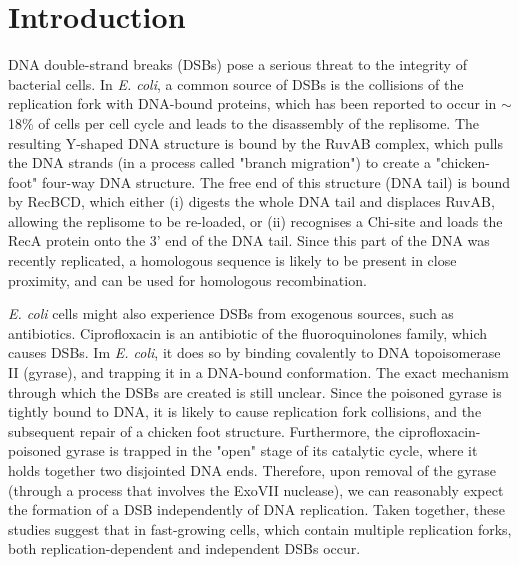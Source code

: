 \section*{Introduction}

DNA double-strand breaks (DSBs) pose a serious threat to the integrity of bacterial cells. In \emph{E. coli}, a common source of DSBs is the collisions of the replication fork with DNA-bound proteins, which has been reported to occur in $\sim$18\% of cells per cell cycle\cite{Sinha2018} and leads to the disassembly of the replisome\cite{Michel1997}. The resulting Y-shaped DNA structure is bound by the RuvAB complex, which pulls the DNA strands (in a process called "branch migration") to create a "chicken-foot" four-way DNA structure\cite{Seigneur1998}. The free end of this structure (DNA tail) is bound by RecBCD, which either (i) digests the whole DNA tail and displaces RuvAB, allowing the replisome to be re-loaded, or (ii) recognises a Chi-site and loads the RecA protein onto the 3' end of the DNA tail\cite{Michel2001}. Since this part of the DNA was recently replicated, a homologous sequence is likely to be present in close proximity, and can be used for homologous recombination.

\emph{E. coli} cells might also experience DSBs from exo\-genous sources, such as anti\-biotics. Ciprofloxacin is an antibiotic of the fluoro\-quinolones family, which causes DSBs. Im \emph{E. coli}, it does so by binding covalently to DNA topoisomerase II (gyrase), and trapping it in a DNA-bound conformation\cite{Kohanski2010}. The exact mechanism through which the DSBs are created is still unclear. Since the poisoned gyrase is tightly bound to DNA, it is likely to cause replication fork collisions\cite{Wentzell2000, Drlica2008}, and the subsequent repair of a chicken foot structure. Furthermore, the ciprofloxacin-poisoned gyrase is trapped in the "open" stage of its catalytic cycle, where it holds together two disjointed DNA ends. Therefore, upon removal of the gyrase (through a process that involves the ExoVII nuclease\cite{Huang2021}), we can reasonably expect the formation of a DSB independently of DNA replication\cite{Zhao2006}. Taken together, these studies suggest that in fast-growing cells, which contain multiple replication forks, both replication-dependent and independent DSBs occur.

